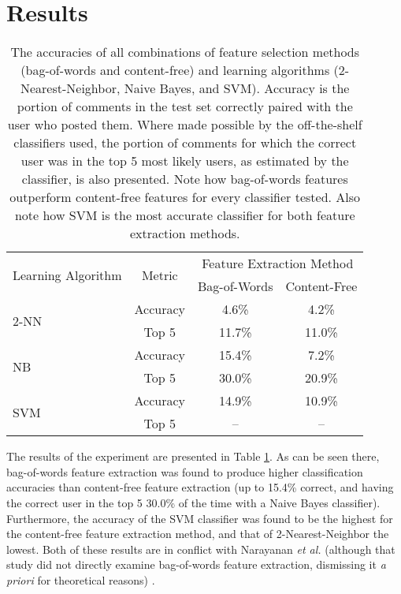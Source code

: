\documentclass[12pt]{article}
\begin{document}
\section{Results}

\begin{table}
\begin{center}
\begin{tabular}{|l|c|c|c|}
\hline \multirow{2}{*}{Learning Algorithm} & \multirow{2}{*}{Metric} & \multicolumn{2}{|c|}{Feature Extraction Method} \\
\hhline{~~--}
 & & Bag-of-Words & Content-Free \\
\hline \multirow{2}{*}{2-NN} & Accuracy & 4.6\% & 4.2\% \\
\hhline{~---}
 & Top 5 & 11.7\% & 11.0\% \\
\hline \multirow{2}{*}{NB} & Accuracy & 15.4\% & 7.2\% \\
\hhline{~---}
 & Top 5 & 30.0\% & 20.9\% \\
\hline \multirow{2}{*}{SVM} & Accuracy & 14.9\% & 10.9\% \\
\hhline{~---}
 & Top 5 & -- & -- \\
\hline
\end{tabular}
\end{center}
\caption{\label{tbl:results}
The accuracies of all combinations of feature selection methods (bag-of-words and content-free) and learning algorithms (2-Nearest-Neighbor, Naive Bayes, and SVM). Accuracy is the portion of comments in the test set correctly paired with the user who posted them. Where made possible by the off-the-shelf classifiers used, the portion of comments for which the correct user was in the top 5 most likely users, as estimated by the classifier, is also presented. Note how bag-of-words features outperform content-free features for every classifier tested. Also note how SVM is the most accurate classifier for both feature extraction methods.
}
\end{table}

The results of the experiment are presented in Table \ref{tbl:results}. As can be seen there, bag-of-words feature extraction was found to produce higher classification accuracies than content-free feature extraction (up to 15.4\% correct, and having the correct user in the top 5 30.0\% of the time with a Naive Bayes classifier). Furthermore, the accuracy of the SVM classifier was found to be the highest for the content-free feature extraction method, and that of 2-Nearest-Neighbor the lowest. Both of these results are in conflict with Narayanan \textit{et al.} (although that study did not directly examine bag-of-words feature extraction, dismissing it \textit{a priori} for theoretical reasons) \cite{narayanan2012feasibility}.
\end{document}
